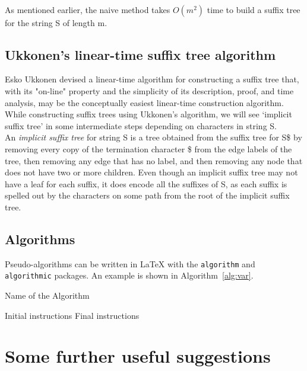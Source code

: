 \documentclass[11pt,a4paper]{article}
\begin{document}
\\
As mentioned earlier, the naive method takes \begin{math}O(m^2)\end{math}
time to build a suffix tree for the string S of length m.

\subsection{Ukkonen's linear-time suffix tree algorithm}
\label{subsec:tables}
Esko Ukkonen devised a linear-time algorithm for constructing a suffix tree that, with its "on-line" property and the simplicity of its description, proof, and time analysis, may be the conceptually easiest linear-time construction algorithm. 
\\
While constructing suffix trees using Ukkonen's algorithm, we will see `implicit suffix tree' in some intermediate steps depending on characters in string S.
\\
An \emph{implicit suffix tree} for string S is a tree obtained from the suffix tree for S\$ by removing every copy of the termination character \$ from the edge labels of the tree, then removing any edge that has no label, and then removing any node that does not have two or more children. Even though an implicit suffix tree may not have a leaf for each suffix, it does encode all the suffixes of S, as each suffix is spelled out by the characters on some path from the root of the implicit suffix tree.

\subsection{Algorithms}
\label{subsec:algorithms}

Pseudo-algorithms can be written in \LaTeX{} with the \texttt{algorithm} and \texttt{algorithmic} packages.
An example is shown in Algorithm~\ref{alg:var}.
\begin{algorithm}[H]
\label{alg:example}
\caption{Name of the Algorithm}
\label{alg:var}
\label{protocol1}
\begin{algorithmic}[1]
\STATE Initial instructions
\ENDIF
\ENDFOR
{}
\ENDWHILE
\STATE Final instructions
\end{algorithmic}
\end{algorithm} 

\section{Some further useful suggestions}
\end{document}
